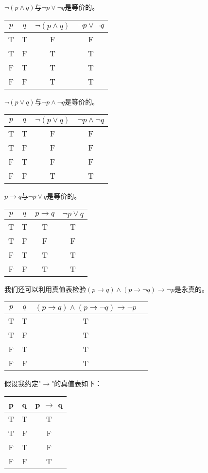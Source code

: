 \documentclass{article}
\begin{document}
\begin{CJK}{UTF8}{gbsn}
  $\lnot (p\land q)$与$\lnot p \lor \lnot q$是等价的。

      \begin{tabular}{cc|cc}
    $p$& $q$&$\lnot (p\land q)$ &$\lnot p \lor \lnot q$\\
    \hline
    T&T&F&F\\
    T&F&T&T\\
    F&T&T&T\\
      F&F&T&T\\      
  \end{tabular}


  $\lnot (p \lor q)$与$\lnot p \land \lnot q$是等价的。
  
      \begin{tabular}{cc|cc}
    $p$& $q$&$\lnot (p \lor q)$&$\lnot p \land \lnot q$\\
    \hline
    T&T&F&F\\
    T&F&F&F\\
    F&T&F&F\\
    F&F&T&T\\      
  \end{tabular}

  $p \to q$与$\lnot p \lor q$是等价的。
  
      \begin{tabular}{cc|cc}
    $p$& $q$&$p \to q$&$\lnot p \lor q$\\
    \hline
    T&T&T&T\\
    T&F&F&F\\
    F&T&T&T\\
    F&F&T&T\\      
  \end{tabular}
  

  我们还可以利用真值表检验$(p\to q) \land (p\to \lnot q) \to \lnot p$是永真的。
  
      \begin{tabular}{cc|cc}
    $p$& $q$&$(p\to q) \land (p\to \lnot q) \to \lnot p$\\
    \hline
    T&T&T\\
    T&F&T\\
    F&T&T\\
    F&F&T\\      
      \end{tabular}

      假设我约定"$\to$"的真值表如下：

    \begin{tabular}{cc|c}
    p& q& p $\to$ q\\
    \hline
    T&T&T\\
    T&F&F\\
    F&T&F\\
    F&F&T\\
    \end{tabular}\hspace{0.87cm}


\end{CJK}
\end{document}
